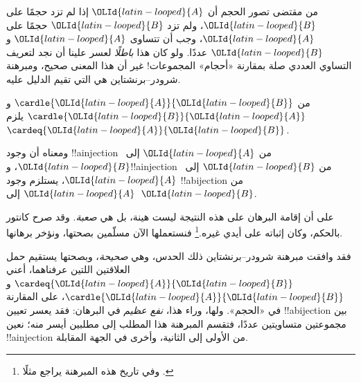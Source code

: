 \documentclass[../../../include/open-logic-section]{subfiles}
\begin{document}


\begin{explain}
من مقتضى تصور الحجم أن $\OLId{latin-looped}{A}$ إذا لم تزد حجمًا على $\OLId{latin-looped}{B}$، ولم تزد $\OLId{latin-looped}{B}$ حجمًا على $\OLId{latin-looped}{A}$، وجب أن تتساوى $\OLId{latin-looped}{A}$ و$\OLId{latin-looped}{B}$ عددًا. ولو كان هذا \emph{باطلًا} لعسر علينا أن نجد لتعريف التساوي العددي صلة بمقارنة «أحجام» المجموعات!{} غير أن هذا المعنى صحيح، ومبرهنة شرودر–برنشتاين هي التي تقيم الدليل عليه.
\end{explain}

\begin{thm}
من $\cardle{\OLId{latin-looped}{A}}{\OLId{latin-looped}{B}}$ و$\cardle{\OLId{latin-looped}{B}}{\OLId{latin-looped}{A}}$ يلزم $\cardeq{\OLId{latin-looped}{A}}{\OLId{latin-looped}{B}}$.
\end{thm}

\begin{explain}
ومعناه أن وجود !!a{injection} من $\OLId{latin-looped}{A}$ إلى~$\OLId{latin-looped}{B}$، و!!a{injection} من $\OLId{latin-looped}{B}$ إلى~$\OLId{latin-looped}{A}$، يستلزم وجود !!a{bijection} من $\OLId{latin-looped}{A}$ إلى~$\OLId{latin-looped}{B}$.

على أن إقامة البرهان على هذه النتيجة ليست هينة، بل هي \emph{صعبة}. وقد صرح كانتور بالحكم، وكان إثباته على أيدي غيره.\footnote{وفي تاريخ هذه المبرهنة يراجع مثلًا \citet[ص~165--6]{Potter2004}.}
%
فنستعملها الآن مسلّمين بصحتها، ونؤخر برهانها.

فقد وافقت مبرهنة شرودر–برنشتاين ذلك الحدس، وهي \emph{صحيحة}، وبصحتها يستقيم حمل العلاقتين اللتين عرفناهما، أعني $\cardeq{\OLId{latin-looped}{A}}{\OLId{latin-looped}{B}}$ و$\cardle{\OLId{latin-looped}{A}}{\OLId{latin-looped}{B}}$، على المقارنة في «الحجم». ولها، وراء هذا، \emph{نفع عظيم} في البرهان: فقد يعسر تعيين !!a{bijection} بين مجموعتين متساويتين عددًا، فتقسم المبرهنة هذا المطلب إلى مطلبين أيسر منه؛ نعين !!a{injection} من الأولى إلى الثانية، وأخرى في الجهة المقابلة.
\end{explain}
\end{document}
